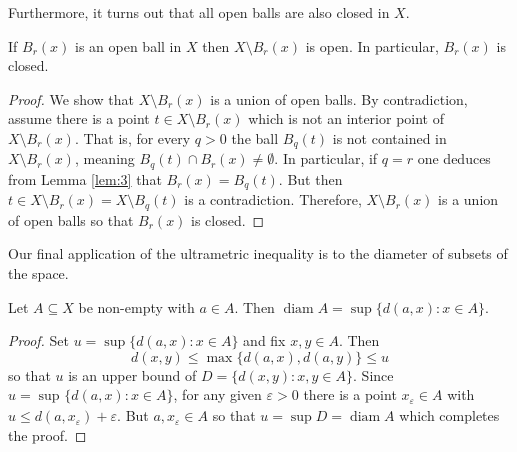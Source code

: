 Furthermore, it turns out that all open balls are also closed in \( X \).
\begin{lemma}
\label{lem:5}
If \( B_{r } (x) \) is an open ball in \( X \) then \( X \setminus  B_{r} (x) \) is open. In particular, \( B_{r} (x) \) is closed.
\end{lemma}
\begin{proof}
We show that \( X \setminus B_{r} (x) \) is a union of open balls. By contradiction, assume there is a point \( t \in X \setminus B_{r} (x) \) which is not an interior point of \( X \setminus B_{r} (x) \). That is, for every \( q > 0 \) the ball \( B_{q} (t) \) is not contained in \( X \setminus B_{r} (x) \), meaning \( B_{q} (t) \cap B_{r} (x) \neq \emptyset  \). In particular, if \( q = r \) one deduces from Lemma \ref{lem:3} that \( B_{r} (x) = B_{q} (t) \). But then \( t \in X \setminus B_{r} (x) = X \setminus B_{q} (t) \) is a contradiction. Therefore, \( X \setminus B_{r} (x) \) is a union of open balls so that \( B_{r} (x) \) is closed.
\end{proof}
Our final application of the ultrametric inequality is to the diameter of subsets of the space.
\begin{lemma}
\label{lem:6}
Let \( A \subseteq X \) be non-empty with \( a \in A \). Then \( \operatorname{diam} A = \sup \{ d(a, x) : x \in A \}   \).
\end{lemma}
\begin{proof}
	Set \( u = \sup \{ d(a,x) : x \in A \}  \) and fix \( x,y \in A \). Then \[ d(x,y) \leq  \max \{ d(a,x), d(a,y) \} \leq u  \] so that \( u \) is an upper bound of \( D = \{ d(x,y) : x,y \in A \}  \). Since \( u = \sup_{} \{ d(a,x) : x \in A \}  \), for any given \( \varepsilon > 0 \) there is a point \( x_{\varepsilon } \in A \) with \( u \leq d(a, x_{\varepsilon }) + \varepsilon   \). But \( a, x_{\varepsilon } \in A \) so that \( u = \sup D = \operatorname{diam} A \) which completes the proof.
\end{proof}

